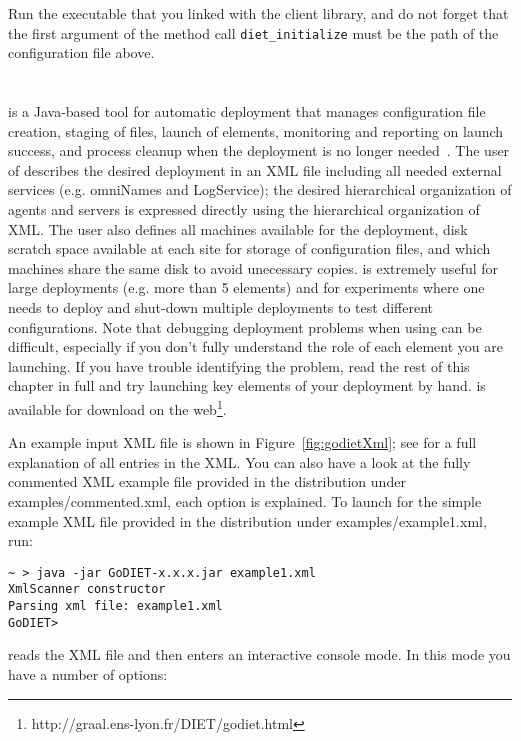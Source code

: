 Run the executable that you linked with the \diet client library, and
do not forget that the first argument of the method call
\texttt{diet\_initialize} must be the path of the configuration
file above.

\section{\godiet}
\label{sec:deployGoDIET}

\godiet is a Java-based tool for automatic \diet deployment that
manages configuration file creation, staging of files, launch of
elements, monitoring and reporting on launch success, and process
cleanup when the \diet deployment is no longer needed~\cite{CDa05}.
The user of \godiet describes the desired deployment in an XML file
including all needed external services (e.g. omniNames and
LogService); the desired hierarchical organization of agents and
servers is expressed directly using the hierarchical organization of
XML.  The user also defines all machines available for the
deployment, disk scratch space available at each site for storage of
configuration files, and which machines share the same disk to avoid
unecessary copies. \godiet is extremely useful for large deployments
(e.g. more than 5 elements) and for experiments where one needs to
deploy and shut-down multiple deployments to test different
configurations. Note that debugging deployment problems when using
\godiet can be difficult, especially if you don't fully understand
the role of each element you are launching.  If you have trouble
identifying the problem, read the rest of this chapter in full and
try launching key elements of your deployment by hand.  \godiet is
available for download on the
web\footnote{http://graal.ens-lyon.fr/DIET/godiet.html}.

An example input XML file is shown in Figure~\ref{fig:godietXml}; see
\cite{CDa05} for a full explanation of all entries in the XML. You can
also have a look at the fully commented XML example file provided in
the \godiet distribution under examples/commented.xml, each option is
explained. To launch \godiet for the simple example XML file provided
in the \godiet distribution under examples/example1.xml, run:

\begin{verbatim}
~ > java -jar GoDIET-x.x.x.jar example1.xml
XmlScanner constructor
Parsing xml file: example1.xml
GoDIET>
\end{verbatim}

\godiet reads the XML file and then enters an interactive console mode.
In this mode you have a number of options:

